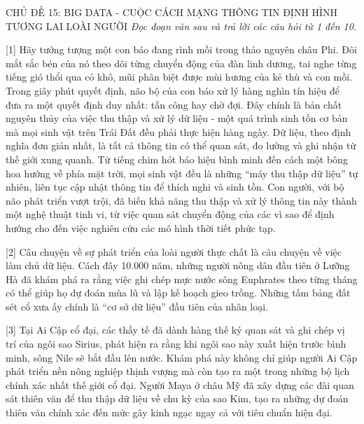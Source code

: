 \documentclass[12pt,a4paper,twoside]{article}
\newenvironment{readingpassage}[1][]{%
    \begin{tcolorbox}[enhanced, colback=grayLight, colframe=secondaryBlue,
        coltitle=textDark, fonttitle=\bfseries, title={#1},
        rounded corners, arc=3mm, boxrule=1pt,
        left=15pt, right=15pt, top=10pt, bottom=10pt,
        breakable, before skip=10pt, after skip=10pt, drop fuzzy shadow]
    \setstretch{1.3}
}{\end{tcolorbox}}
\begin{document}
\newpage
\label{a_cd15}
\begin{topicbox}{\large CHỦ ĐỀ 15: BIG DATA - CUỘC CÁCH MẠNG THÔNG TIN ĐỊNH HÌNH TƯƠNG LAI LOÀI NGƯỜI}
\vspace{8pt}
\textit{Đọc đoạn văn sau và trả lời các câu hỏi từ 1 đến 10.}
\vspace{6pt}
\end{topicbox}
\vspace{5pt}
\begin{readingpassage}[]
[1] Hãy tưởng tượng một con báo đang rình mồi trong thảo nguyên châu Phi. Đôi mắt sắc bén của nó theo dõi từng chuyển động của đàn linh dương, tai nghe từng tiếng gió thổi qua cỏ khô, mũi phân biệt được mùi hương của kẻ thù và con mồi. Trong giây phút quyết định, não bộ của con báo xử lý hàng nghìn tín hiệu để đưa ra một quyết định duy nhất: tấn công hay chờ đợi. Đây chính là bản chất nguyên thủy của việc thu thập và xử lý dữ liệu - một quá trình sinh tồn cơ bản mà mọi sinh vật trên Trái Đất đều phải thực hiện hàng ngày. Dữ liệu, theo định nghĩa đơn giản nhất, là tất cả thông tin có thể quan sát, đo lường và ghi nhận từ thế giới xung quanh. Từ tiếng chim hót báo hiệu bình minh đến cách một bông hoa hướng về phía mặt trời, mọi sinh vật đều là những ``máy thu thập dữ liệu'' tự nhiên, liên tục cập nhật thông tin để thích nghi và sinh tồn. Con người, với bộ não phát triển vượt trội, đã biến khả năng thu thập và xử lý thông tin này thành một nghệ thuật tinh vi, từ việc quan sát chuyển động của các vì sao để định hướng cho đến việc nghiên cứu các mô hình thời tiết phức tạp.

[2] Câu chuyện về sự phát triển của loài người thực chất là câu chuyện về việc làm chủ dữ liệu. Cách đây 10.000 năm, những người nông dân đầu tiên ở Lưỡng Hà đã khám phá ra rằng việc ghi chép mực nước sông Euphrates theo từng tháng có thể giúp họ dự đoán mùa lũ và lập kế hoạch gieo trồng. Những tấm bảng đất sét cổ xưa ấy chính là ``cơ sở dữ liệu'' đầu tiên của nhân loại.

[3] Tại Ai Cập cổ đại, các thầy tế đã dành hàng thế kỷ quan sát và ghi chép vị trí của ngôi sao Sirius, phát hiện ra rằng khi ngôi sao này xuất hiện trước bình minh, sông Nile sẽ bắt đầu lên nước. Khám phá này không chỉ giúp người Ai Cập phát triển nền nông nghiệp thịnh vượng mà còn tạo ra một trong những bộ lịch chính xác nhất thế giới cổ đại. Người Maya ở châu Mỹ đã xây dựng các đài quan sát thiên văn để thu thập dữ liệu về chu kỳ của sao Kim, tạo ra những dự đoán thiên văn chính xác đến mức gây kinh ngạc ngay cả với tiêu chuẩn hiện đại.


\end{readingpassage}
\end{document}
